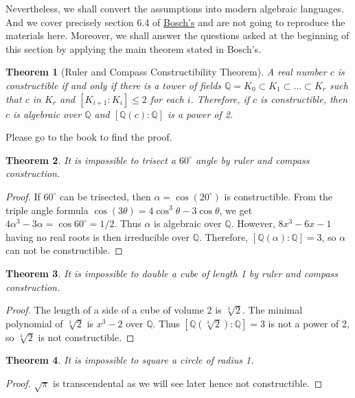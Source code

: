 \documentclass[12pt]{report}
\newtheorem{theorem}{Theorem}[section]
\theoremstyle{definition}
\newcommand{\qq}{\mathbb{Q}}
\begin{document}
Nevertheless, we shall convert the assumptions into modern algebraic languages. And we cover precisely section 6.4 of \hyperlink{https://www.springer.com/gp/book/9783319951768}{Bosch's} and are not going to reproduce the materials here. Moreover, we shall answer the questions asked at the beginning of this section by applying the main theorem stated in Bosch's.

\begin{theorem}[Ruler and Compass Constructibility Theorem]
	A real number $c$ is constructible if and only if there is a tower of fields $\qq=K_0\subset K_1\subset \dots\subset K_r$ such that $c$ in $K_r$ and $[K_{i+1}:K_i]\leq 2$ for each $i$. Therefore, if $c$ is constructible, then $c$ is algebraic over $\qq$ and $[\qq(c):\qq]$ is a power of 2.
\end{theorem}

Please go to the book to find the proof.

\begin{theorem}
	It is impossible to trisect a $60^{\circ}$ angle by ruler and compass construction.
\end{theorem}

\begin{proof}
	If  $60^{\circ}$ can be trisected, then $\alpha=\cos(20^{\circ})$ is constructible. From the triple angle formula $\cos(3\theta)=4\cos^3\theta -3\cos\theta$, we get $4\alpha^3-3\alpha=\cos60^{\circ}=1/2$. Thus $\alpha$ is algebraic over $\qq$. However, $8x^3-6x-1$ having no real roots is then irreducible over $\qq$. Therefore, $[\qq(\alpha):\qq]=3$, so $\alpha$ can not be constructible.
\end{proof}

\begin{theorem}
	It is impossible to double a cube of length 1 by ruler and compass construction.
\end{theorem}

\begin{proof}
	The length of a side of a cube of volume 2 is $\sqrt[3]{2}$. The minimal polynomial of $\sqrt[3]{2}$ is $x^3-2$ over $\qq$. Thus $[\qq(\sqrt[3]{2}):\qq]=3$ is not a power of 2, so $\sqrt[3]{2}$ is not constructible.
\end{proof}

\begin{theorem}
	It is impossible to square a circle of radius 1.
\end{theorem}

\begin{proof}
	$\sqrt{\pi}$ is transcendental as we will see later hence not constructible.
\end{proof}
\end{document}
